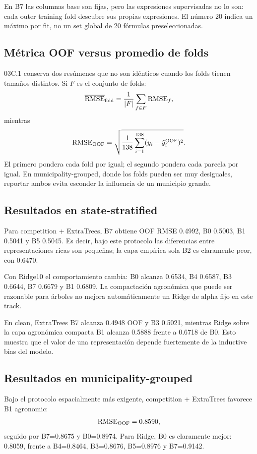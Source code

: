 En B7 las columnas base son fijas, pero las expresiones supervisadas no lo son: cada outer
training fold descubre sus propias expresiones. El número 20 indica un máximo por fit, no un
set global de 20 fórmulas preseleccionadas.

\subsection{Métrica OOF versus promedio de folds}

03C.1 conserva dos resúmenes que no son idénticos cuando los folds tienen tamaños distintos.
Si $F$ es el conjunto de folds:
\[
\overline{\operatorname{RMSE}}_{\mathrm{fold}}
=
\frac{1}{|F|}
\sum_{f\in F}\operatorname{RMSE}_f,
\]
mientras
\[
\operatorname{RMSE}_{\mathrm{OOF}}
=
\sqrt{
\frac{1}{138}
\sum_{i=1}^{138}
(y_i-\hat y_i^{\mathrm{OOF}})^2
}.
\]
El primero pondera cada fold por igual; el segundo pondera cada parcela por igual. En
municipality-grouped, donde los folds pueden ser muy desiguales, reportar ambos evita esconder
la influencia de un municipio grande.

\subsection{Resultados en state-stratified}

Para competition + ExtraTrees, B7 obtiene OOF RMSE 0.4992, B0 0.5003, B1 0.5041 y B5
0.5045. Es decir, bajo este protocolo las diferencias entre representaciones ricas son
pequeñas; la capa empírica sola B2 es claramente peor, con 0.6470.

Con Ridge10 el comportamiento cambia: B0 alcanza 0.6534, B4 0.6587, B3 0.6644, B7 0.6679 y
B1 0.6809. La compactación agronómica que puede ser razonable para árboles no mejora
automáticamente un Ridge de alpha fijo en este track.

En clean, ExtraTrees B7 alcanza 0.4948 OOF y B3 0.5021, mientras Ridge sobre la capa
agronómica compacta B1 alcanza 0.5888 frente a 0.6718 de B0. Esto muestra que el valor de una
representación depende fuertemente de la inductive bias del modelo.

\subsection{Resultados en municipality-grouped}

Bajo el protocolo espacialmente más exigente, competition + ExtraTrees favorece B1 agronomic:
\[
\operatorname{RMSE}_{\mathrm{OOF}}=0.8590,
\]
seguido por B7=0.8675 y B0=0.8974. Para Ridge, B0 es claramente mejor:
0.8059, frente a B4=0.8464, B3=0.8676, B5=0.8976 y B7=0.9142.

